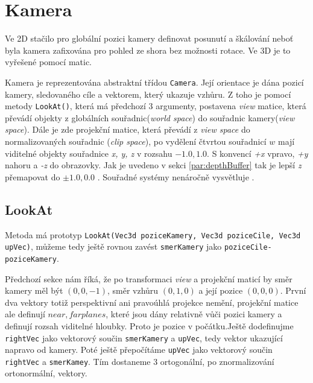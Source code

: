 \section{Kamera}
Ve 2D stačilo pro globální pozici kamery definovat posunutí a škálování neboť byla kamera zafixována pro pohled ze shora bez možnosti rotace. Ve 3D je to vyřešené pomocí matic. 

Kamera je reprezentována abstraktní třídou \texttt{Camera}. Její orientace je dána pozicí kamery, sledovaného cíle a vektorem, který ukazuje vzhůru. Z toho je pomocí metody \texttt{LookAt()}, která má předchozí 3 argumenty,  postavena \textit{view} matice, která převádí objekty z globálních souřadnic(\textit{world space}) do souřadnic kamery(\textit{view space}). Dále je zde projekční matice, která převádí z \textit{view space} do normalizovaných souřadnic (\textit{clip space}), po vydělení čtvrtou souřadnicí $ w $ mají viditelné objekty souřadnice \textit{x, y, z} v rozsahu $ -1.0,1.0 $. S konvencí \textit{+x} vpravo,  \textit{+y} nahoru a \textit{-z} do obrazovky.
Jak je uvedeno v sekci \ref{par:depthBuffer} tak je lepší  \textit{z} přemapovat do $ \pm 1.0,0.0$ . Souřadné systémy nenáročně vysvětluje \cite{coords}.

\subsection{LookAt}
\label{sec:odvozKamery}
Metoda má prototyp \lstinline|LookAt(Vec3d poziceKamery, Vec3d poziceCile, Vec3d upVec)|, můžeme tedy ještě rovnou zavést \lstinline|smerKamery| jako \lstinline|poziceCile-poziceKamery|.

Předchozí sekce nám říká, že po transformaci \textit{view} a projekční maticí by směr kamery měl být $ (0,0,-1) $, směr vzhůru $ (0,1,0) $ a její pozice $ (0,0,0) $.  První dva vektory totiž perspektivní ani pravoúhlá projekce nemění, projekční matice ale definují $ near, far planes  $, které jsou dány relativně vůči pozici kamery a definují rozsah viditelné hloubky. Proto je pozice v počátku.Ještě dodefinujme \lstinline|rightVec| jako vektorový součin \lstinline|smerKamery| a \lstinline|upVec|, tedy vektor ukazující napravo od kamery. Poté ještě přepočítáme \lstinline|upVec| jako vektorový součin \lstinline|rightVec| a \lstinline|smerKamey|. Tím dostaneme 3 ortogonální, po znormalizování ortonormální, vektory.

